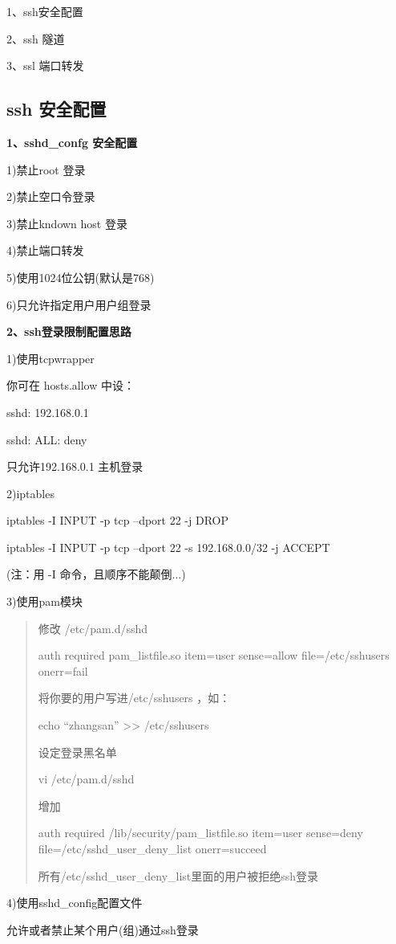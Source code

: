 \documentclass[letterpaper,10pt]{sphinxmanual}
\begin{document}
1、ssh安全配置

2、ssh 隧道

3、ssl 端口转发


\subsection{ssh 安全配置}
\label{Linux_ssh/config::doc}\label{Linux_ssh/config:ssh}
\textbf{1、sshd\_confg 安全配置}

1)禁止root 登录

2)禁止空口令登录

3)禁止kndown host 登录

4)禁止端口转发

5)使用1024位公钥(默认是768)

6)只允许指定用户\textbar{}用户组登录

\textbf{2、ssh登录限制配置思路}

1)使用tcpwrapper

你可在 hosts.allow 中设：

sshd: 192.168.0.1

sshd: ALL: deny

只允许192.168.0.1 主机登录

2)iptables

iptables -I INPUT -p tcp --dport 22 -j DROP

iptables -I INPUT -p tcp --dport 22 -s 192.168.0.0/32 -j ACCEPT

(注：用 -I 命令，且顺序不能颠倒...)

3)使用pam模块
\begin{quote}

修改 /etc/pam.d/sshd

auth required pam\_listfile.so item=user sense=allow file=/etc/sshusers onerr=fail

将你要的用户写进/etc/sshusers ，如：

echo ``zhangsan'' \textgreater{}\textgreater{} /etc/sshusers

设定登录黑名单

vi /etc/pam.d/sshd

增加

auth required /lib/security/pam\_listfile.so item=user sense=deny file=/etc/sshd\_user\_deny\_list onerr=succeed

所有/etc/sshd\_user\_deny\_list里面的用户被拒绝ssh登录
\end{quote}

4)使用sshd\_config配置文件

允许或者禁止某个用户(组)通过ssh登录
\end{document}
